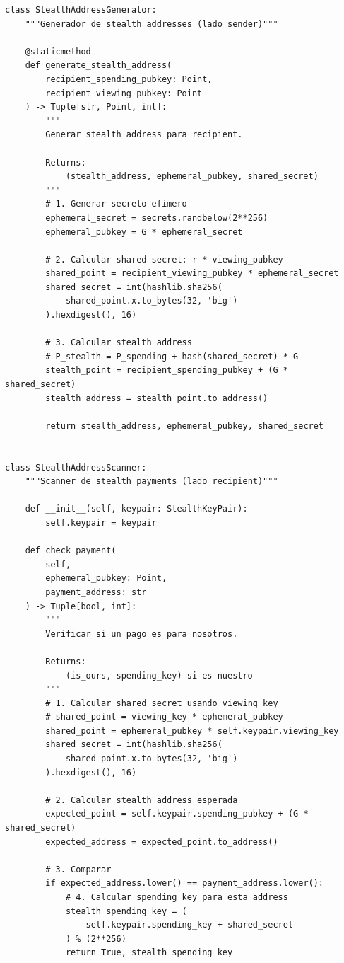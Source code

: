 \documentclass[11pt,a4paper,twoside]{book}
\theoremstyle{definition}
\theoremstyle{remark}
\begin{document}
\begin{lstlisting}[style=python, caption={Implementación simplificada de Stealth Addresses}]
class StealthAddressGenerator:
    """Generador de stealth addresses (lado sender)"""
    
    @staticmethod
    def generate_stealth_address(
        recipient_spending_pubkey: Point,
        recipient_viewing_pubkey: Point
    ) -> Tuple[str, Point, int]:
        """
        Generar stealth address para recipient.
        
        Returns:
            (stealth_address, ephemeral_pubkey, shared_secret)
        """
        # 1. Generar secreto efimero
        ephemeral_secret = secrets.randbelow(2**256)
        ephemeral_pubkey = G * ephemeral_secret
        
        # 2. Calcular shared secret: r * viewing_pubkey
        shared_point = recipient_viewing_pubkey * ephemeral_secret
        shared_secret = int(hashlib.sha256(
            shared_point.x.to_bytes(32, 'big')
        ).hexdigest(), 16)
        
        # 3. Calcular stealth address
        # P_stealth = P_spending + hash(shared_secret) * G
        stealth_point = recipient_spending_pubkey + (G * shared_secret)
        stealth_address = stealth_point.to_address()
        
        return stealth_address, ephemeral_pubkey, shared_secret


class StealthAddressScanner:
    """Scanner de stealth payments (lado recipient)"""
    
    def __init__(self, keypair: StealthKeyPair):
        self.keypair = keypair
    
    def check_payment(
        self, 
        ephemeral_pubkey: Point,
        payment_address: str
    ) -> Tuple[bool, int]:
        """
        Verificar si un pago es para nosotros.
        
        Returns:
            (is_ours, spending_key) si es nuestro
        """
        # 1. Calcular shared secret usando viewing key
        # shared_point = viewing_key * ephemeral_pubkey
        shared_point = ephemeral_pubkey * self.keypair.viewing_key
        shared_secret = int(hashlib.sha256(
            shared_point.x.to_bytes(32, 'big')
        ).hexdigest(), 16)
        
        # 2. Calcular stealth address esperada
        expected_point = self.keypair.spending_pubkey + (G * shared_secret)
        expected_address = expected_point.to_address()
        
        # 3. Comparar
        if expected_address.lower() == payment_address.lower():
            # 4. Calcular spending key para esta address
            stealth_spending_key = (
                self.keypair.spending_key + shared_secret
            ) % (2**256)
            return True, stealth_spending_key
        

\end{lstlisting}
\end{document}
